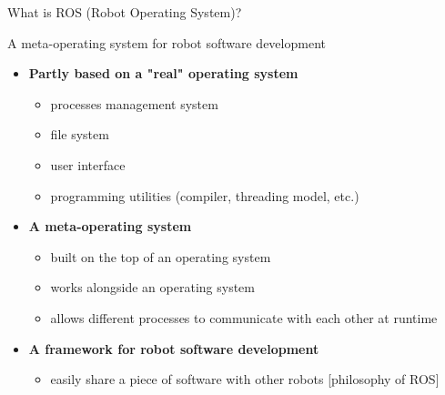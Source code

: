 \documentclass[10pt]{beamer}
\begin{document}
 \begin{frame}{What is ROS (Robot Operating System)?}
   \begin{block}{A meta-operating system for robot software development}
    \begin{itemize}
     \pause
     \item {\bf{Partly based on a "real" operating system}}
     \begin{itemize}
      \item processes management system
      \item file system
      \item user interface
      \item programming utilities (compiler, threading model, etc.)
     \end{itemize}
     \pause
     \item {\bf{A meta-operating system}}
     \begin{itemize}
      \item built on the top of an operating system
      \item works alongside an operating system
      \item allows different processes to communicate with each other at runtime
     \end{itemize}
     \pause
     \item {\bf{A framework for robot software development}}
     \begin{itemize}
      \item easily share a piece of software with other robots [philosophy of ROS]
     \end{itemize}
    \end{itemize}
   \end{block}
 \end{frame}
 
\end{document}
